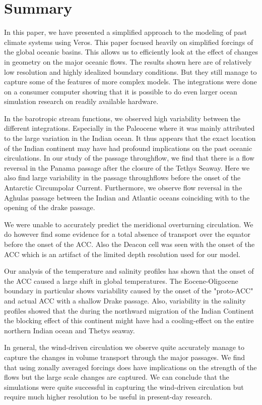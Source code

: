 \section{Summary}
In this paper, we have presented a simplified approach to the modeling of past climate systems using Veros. This paper focused heavily on simplified forcings of the global oceanic basins. This allows us to efficiently look at the effect of changes in geometry on the major oceanic flows. The results shown here are of relatively low resolution and highly idealized boundary conditions. But they still manage to capture some of the features of more complex models. The integrations were done on a consumer computer showing that it is possible to do even larger ocean simulation research on readily available hardware.

In the barotropic stream functions, we observed high variability between the different integrations. Especially in the Paleocene where it was mainly attributed to the large variation in the Indian ocean. It thus appears that the exact location of the Indian continent may have had profound implications on the past oceanic circulations. In our study of the passage throughflow, we find that there is a flow reversal in the Panama passage after the closure of the Tethys Seaway. Here we also find large variability in the passage throughflows before the onset of the Antarctic Circumpolar Current. Furthermore, we observe flow reversal in the Aghulas passage between the Indian and Atlantic oceans coinciding with to the opening of the drake passage. 

We were unable to accurately predict the meridional overturning circulation. We do however find some evidence for a total absence of transport over the equator before the onset of the ACC. Also the Deacon cell was seen with the onset of the ACC which is an artifact of the limited depth resolution used for our model.

Our analysis of the temperature and salinity profiles has shown that the onset of the ACC caused a large shift in global temperatures. The Eocene-Oligocene boundary in particular shows variability caused by the onset of the "proto-ACC" and actual ACC with a shallow Drake passage. Also, variability in the salinity profiles showed that the during the northward migration of the Indian Continent the blocking effect of this continent might have had a cooling-effect on the entire northern Indian ocean and Thetys seaway.

In general, the wind-driven circulation we observe quite accurately manage to capture the changes in volume transport through the major passages. We find that using zonally averaged forcings does have implications on the strength of the flows but the large scale changes are captured. We can conclude that the simulations were quite successful in capturing the wind-driven circulation but require much higher resolution to be useful in present-day research.
